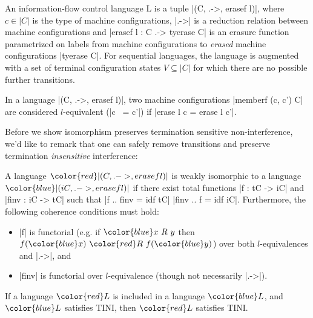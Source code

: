 \begin{definition}
    An information-flow control language L is a tuple |(C, .->,
    erasef l)|, where $c \in |C|$ is the type of machine configurations, |.->| is a
    reduction relation between machine configurations and |erasef l : C .-> tyerase C|
    is an erasure function parametrized on labels from machine configurations to \emph{erased} machine
    configurations |tyerase C|.  For sequential languages, the
    language is augmented with a set of terminal configuration states $V
    \subseteq |C|$ for which there are no possible further transitions.
\end{definition}

\begin{definition}[$l$-equivalence]
    In a language |(C, .->, erasef l)|, two machine configurations
    |memberf (c, c') C| are considered $l$-equivalent (|c ~= c'|)
    if |erase l c = erase l c'|.
\end{definition}

\newcommand{\con}[1]{\ensuremath{{\color{red} #1}}}
\newcommand{\abs}[1]{\ensuremath{{\color{blue} #1}}}

Before we show isomorphism preserves termination sensitive
non-interference, we'd like to remark that one can safely remove transitions
and preserve termination \emph{insensitive} interference:

\begin{definition}
    A language \con{|(C, .->, erasef l)|} is weakly isomorphic to a
    language \abs{|(iC, .->, erasef l)|} if there exist total functions
    |f : tC -> iC| and |finv : iC -> tC| such that |f .. finv = idf tC|
    |finv .. f = idf iC|.  Furthermore, the following coherence conditions
    must hold:
    \begin{itemize}
        \item |f| is functorial (e.g. if $\abs{x\ R\ y}$ then
            $f(\abs{x})\ \con{R}\ f(\abs{y})$) over both
            $l$-equivalences and |.->|, and
        \item |finv| is functorial over $l$-equivalence (though not necessarily |.->|).
    \end{itemize}
\end{definition}

\begin{theorem}
    If a language \con{L} is included in a language \abs{L}, and \abs{L}
    satisfies TINI, then \con{L} satisfies TINI.
\end{theorem}

